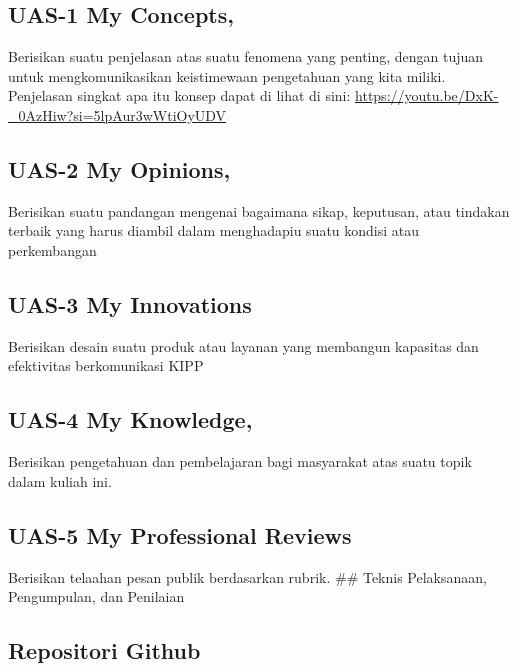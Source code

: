 \documentclass[
  letterpaper,
  DIV=11,
  numbers=noendperiod]{scrreprt}
\begin{document}
\subsection*{UAS-1 My Concepts,}\label{uas-1-my-concepts}

Berisikan suatu penjelasan atas suatu fenomena yang penting, dengan
tujuan untuk mengkomunikasikan keistimewaan pengetahuan yang kita
miliki. Penjelasan singkat apa itu konsep dapat di lihat di sini:
\url{https://youtu.be/DxK-_0AzHiw?si=5lpAur3wWtiOyUDV}

\subsection*{UAS-2 My Opinions,}\label{uas-2-my-opinions}

Berisikan suatu pandangan mengenai bagaimana sikap, keputusan, atau
tindakan terbaik yang harus diambil dalam menghadapiu suatu kondisi atau
perkembangan

\subsection*{UAS-3 My Innovations}\label{uas-3-my-innovations}

Berisikan desain suatu produk atau layanan yang membangun kapasitas dan
efektivitas berkomunikasi KIPP

\subsection*{UAS-4 My Knowledge,}\label{uas-4-my-knowledge}

Berisikan pengetahuan dan pembelajaran bagi masyarakat atas suatu topik
dalam kuliah ini.

\subsection*{UAS-5 My Professional
Reviews}\label{uas-5-my-professional-reviews}

Berisikan telaahan pesan publik berdasarkan rubrik. \#\# Teknis
Pelaksanaan, Pengumpulan, dan Penilaian

\subsection*{Repositori Github}\label{repositori-github}
\end{document}
